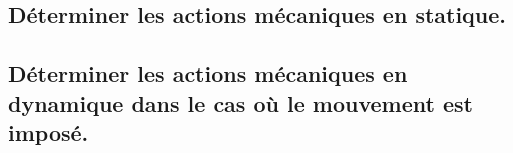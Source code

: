 \documentclass[10pt,fleqn]{book}
\newcommand{\repRel}{../..}
\newcommand{\repStyle}{\repRel/Style}
\newcommand{\td}{fichier_td}
\newcommand{\repExos}{\repRel/ExercicesCompetences}
\newcommand{\repExo}{dossier}
\begin{document}
\subsection{Déterminer les actions mécaniques en statique.} 

\begin{multicols}{2} 

\renewcommand{\repExo}{\repExos/C2_MettreEnOeuvreDemarche/C2_07_PFS/01_T}
\renewcommand{\td}{01_T}
\graphicspath{{\repStyle/png/}{\repExo/images/}}


\renewcommand{\repExo}{\repExos/C2_MettreEnOeuvreDemarche/C2_07_PFS/02_R}
\renewcommand{\td}{02_R}
\graphicspath{{\repStyle/png/}{\repExo/images/}}


\renewcommand{\repExo}{\repExos/C2_MettreEnOeuvreDemarche/C2_07_PFS/14_Sympact}
\renewcommand{\td}{14_Sympact}
\graphicspath{{\repStyle/png/}{\repExo/images/}}


\renewcommand{\repExo}{\repExos/C2_MettreEnOeuvreDemarche/C2_07_PFS/515_Divers_Potence}
\renewcommand{\td}{515_Divers_Potence}
\graphicspath{{\repStyle/png/}{\repExo/images/}}


\renewcommand{\repExo}{\repExos/C2_MettreEnOeuvreDemarche/C2_07_PFS/55_Suspension}
\renewcommand{\td}{55_Suspension}
\graphicspath{{\repStyle/png/}{\repExo/images/}}


\renewcommand{\repExo}{\repExos/C2_MettreEnOeuvreDemarche/C2_07_PFS/56_RobotAvion}
\renewcommand{\td}{56_RobotAvion}
\graphicspath{{\repStyle/png/}{\repExo/images/}}


\renewcommand{\repExo}{\repExos/C2_MettreEnOeuvreDemarche/C2_07_PFS/57_PeseCamion}
\renewcommand{\td}{57_PeseCamion}
\graphicspath{{\repStyle/png/}{\repExo/images/}}


\renewcommand{\repExo}{\repExos/C2_MettreEnOeuvreDemarche/C2_07_PFS/57_PeseCamion_02}
\renewcommand{\td}{57_PeseCamion_02}
\graphicspath{{\repStyle/png/}{\repExo/images/}}


\renewcommand{\repExo}{\repExos/C2_MettreEnOeuvreDemarche/C2_07_PFS/64_EPAS}
\renewcommand{\td}{64_EPAS}
\graphicspath{{\repStyle/png/}{\repExo/images/}}


\end{multicols}

\subsection{Déterminer les actions mécaniques en dynamique dans le cas où le mouvement est imposé.} 
\end{document}
